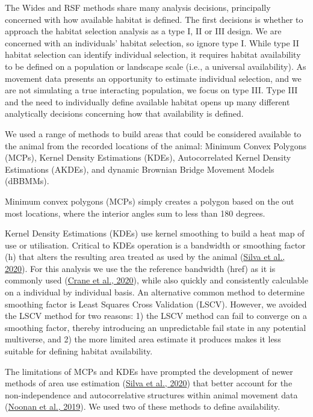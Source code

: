 \documentclass[10pt,a4paper]{article}
\begin{document}
The Wides and RSF methods share many analysis decisions, principally concerned with how available habitat is defined.
The first decisions is whether to approach the habitat selection analysis as a type I, II or III design.
We are concerned with an individuals' habitat selection, so ignore type I.
While type II habitat selection can identify individual selection, it requires habitat availability to be defined on a population or landscape scale (i.e., a universal availability).
As movement data presents an opportunity to estimate individual selection, and we are not simulating a true interacting population, we focus on type III.
Type III and the need to individually define available habitat opens up many different analytically decisions concerning how that availability is defined.

We used a range of methods to build areas that could be considered available to the animal from the recorded locations of the animal: Minimum Convex Polygons (MCPs), Kernel Density Estimations (KDEs), Autocorrelated Kernel Density Estimations (AKDEs), and dynamic Brownian Bridge Movement Models (dBBMMs).

Minimum convex polygons (MCPs) simply creates a polygon based on the out most locations, where the interior angles sum to less than 180 degrees.

Kernel Density Estimations (KDEs) use kernel smoothing to build a heat map of use or utilisation.
Critical to KDEs operation is a bandwidth or smoothing factor (h) that alters the resulting area treated as used by the animal (\protect\hyperlink{ref-silva_reptiles_2020}{Silva et al., 2020}).
For this analysis we use the the reference bandwidth (href) as it is commonly used (\protect\hyperlink{ref-crane_lots_2020}{Crane et al., 2020}), while also quickly and consistently calculable on a individual by individual basis.
An alternative common method to determine smoothing factor is Least Squares Cross Validation (LSCV).
However, we avoided the LSCV method for two reasons: 1) the LSCV method can fail to converge on a smoothing factor, thereby introducing an unpredictable fail state in any potential multiverse, and 2) the more limited area estimate it produces makes it less suitable for defining habitat availability.

The limitations of MCPs and KDEs have prompted the development of newer methods of area use estimation (\protect\hyperlink{ref-silva_reptiles_2020}{Silva et al., 2020}) that better account for the non-independence and autocorrelative structures within animal movement data (\protect\hyperlink{ref-Noonan2018}{Noonan et al., 2019}).
We used two of these methods to define availability.
\end{document}
